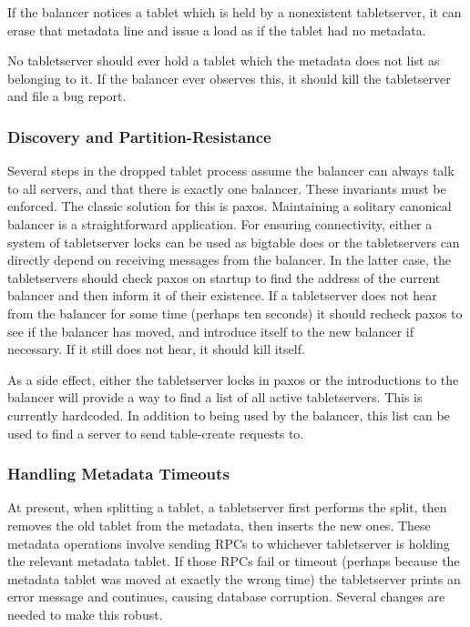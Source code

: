 \documentclass[11pt]{article}
\begin{document}
If the balancer notices a tablet which is held by a nonexistent tabletserver, it can erase that metadata line and issue a load as if the tablet had no metadata.

No tabletserver should ever hold a tablet which the metadata does not list as belonging to it.  If the balancer ever observes this, it should kill the tabletserver and file a bug report.

\subsubsection{Discovery and Partition-Resistance}

Several steps in the dropped tablet process assume the balancer can always talk to all servers, and that there is exactly one balancer.  These invariants must be enforced.  The classic solution for this is paxos.  Maintaining a solitary canonical balancer is a straightforward application.  For ensuring connectivity, either a system of tabletserver locks can be used as bigtable does or the tabletservers can directly depend on receiving messages from the balancer.  In the latter case, the tabletservers should check paxos on startup to find the address of the current balancer and then inform it of their existence.  If a tabletserver does not hear from the balancer for some time (perhaps ten seconds) it should recheck paxos to see if the balancer has moved, and introduce itself to the new balancer if necessary.  If it still does not hear, it should kill itself.

As a side effect, either the tabletserver locks in paxos or the introductions to the balancer will provide a way to find a list of all active tabletservers.  This is currently hardcoded.  In addition to being used by the balancer, this list can be used to find a server to send table-create requests to.

\subsubsection{Handling Metadata Timeouts}

At present, when splitting a tablet, a tabletserver first performs the split, then removes the old tablet from the metadata, then inserts the new ones.  These metadata operations involve sending RPCs to whichever tabletserver is holding the relevant metadata tablet.  If those RPCs fail or timeout (perhaps because the metadata tablet was moved at exactly the wrong time) the tabletserver prints an error message and continues, causing database corruption.  Several changes are needed to make this robust.
\end{document}
